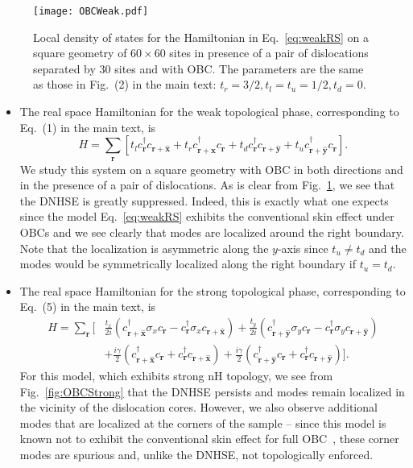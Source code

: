 \documentclass[prb,reprint,twocolumn,preprintnumbers,amsmath,amssymb,showpacs,nofootinbib,superscriptaddress]{revtex4-2}
\begin{document}
\begin{figure}[t]
    \centering
    \texttt{[image: OBCWeak.pdf]}
    \caption{Local density of states for the Hamiltonian in Eq.~\eqref{eq:weakRS} on a square geometry of $60 \times 60$ sites in presence of a pair of dislocations separated by $30$ sites and with OBC. The parameters are the same as those in Fig.~(2) in the main text: $t_r = 3/2, t_l = t_u = 1/2, t_d = 0$.}
    \label{fig:OBCWeak}
\end{figure}

\begin{itemize}

\item The real space Hamiltonian for the weak topological phase, corresponding to Eq.~(1) in the main text, is 
\begin{equation}
\label{eq:weakRS}
    H = \sum_{\bm{r}} \left[ t_l c_{\bm{r}}^\dagger c_{\bm{r} + \bm{\hat{x}}} + t_r c_{\bm{r}+\bm{\hat{x}}}^\dagger c_{\bm{r}} + t_d c_{\bm{r}}^\dagger c_{\bm{r} + \bm{\hat{y}}} + t_u c_{\bm{r} + \bm{\hat{y}}}^\dagger c_{\bm{r}} \right].
\end{equation}
We study this system on a square geometry with OBC in both directions and in the presence of a pair of dislocations. As is clear from Fig.~\ref{fig:OBCWeak}, we see that the DNHSE is greatly suppressed. Indeed, this is exactly what one expects since the model Eq.~\eqref{eq:weakRS} exhibits the conventional skin effect under OBCs and we see clearly that modes are localized around the right boundary. Note that the localization is asymmetric along the $y$-axis since $t_u \neq t_d$ and the modes would be symmetrically localized along the right boundary if $t_u = t_d$.

\item The real space Hamiltonian for the strong topological phase, corresponding to Eq.~(5) in the main text, is 
\begin{equation}
\label{eq:strongRS}
\begin{aligned}
    H = \sum_{\bm{r}} \bigg[&\frac{t_x}{2 i} \left(c_{\bm{r}+\bm{\hat{x}}}^\dagger \sigma_x c_{\bm{r}} - c_{\bm{r}}^\dagger \sigma_x c_{\bm{r}+\bm{\hat{x}}} \right) + \frac{t_y}{2 i} \left(c_{\bm{r}+\bm{\hat{y}}}^\dagger \sigma_y c_{\bm{r}} - c_{\bm{r}}^\dagger \sigma_y c_{\bm{r}+\bm{\hat{y}}} \right) \\
    &+ \frac{i \gamma}{2} \left(c_{\bm{r} + \bm{\hat{x}}}^\dagger c_{\bm{r}} + c_{\bm{r}}^\dagger c_{\bm{r} + \bm{\hat{x}}}  \right) + \frac{i \gamma}{2} \left(c_{\bm{r} + \bm{\hat{y}}}^\dagger c_{\bm{r}} + c_{\bm{r}}^\dagger c_{\bm{r} + \bm{\hat{y}}}  \right) \bigg].
\end{aligned}
\end{equation}
For this model, which exhibits strong nH topology, we see from Fig.~\ref{fig:OBCStrong} that the DNHSE persists and modes remain localized in the vicinity of the dislocation cores. However, we also observe additional modes that are localized at the corners of the sample -- since this model is known not to exhibit the conventional skin effect for full OBC~\cite{okuma2020}, these corner modes are spurious and, unlike the DNHSE, not topologically enforced.


\end{itemize}
\end{document}
